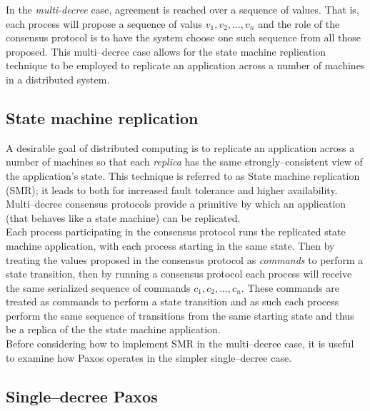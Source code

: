 In the \emph{multi-decree} case, agreement is reached over a sequence of values. That is, each process will propose a sequence of valus $v_1, v_2, \ldots, v_n$ and the role of the consensus protocol is to have the system choose one such sequence from all those proposed. This multi--decree case allows for the state machine replication technique to be employed to replicate an application across a number of machines in a distributed system.




\subsection{State machine replication}


A desirable goal of distributed computing is to replicate an application across a number of machines so that each \emph{replica} has the same strongly--consistent view of the application's state. This technique is referred to as State machine replication (SMR); it leads to both for increased fault tolerance and higher availability. Multi--decree consensus protocols provide a primitive by which an application (that behaves like a state machine) can be replicated. \\

Each process participating in the consensus protocol runs the replicated state machine application, with each process starting in the same state. Then by treating the values proposed in the consensus protocol as \emph{commands} to perform a state transition, then by running a consensus protocol each process will receive the same serialized sequence of commands $c_1, c_2, \ldots, c_n$. These commands are treated as commands to perform a state transition and as such each process perform the same sequence of transitions from the same starting state and thus be a replica of the the state machine application. \\

Before considering how to implement SMR in the multi--decree case, it is useful to examine how Paxos operates in the simpler single--decree case. 



\subsection{Single--decree Paxos}

